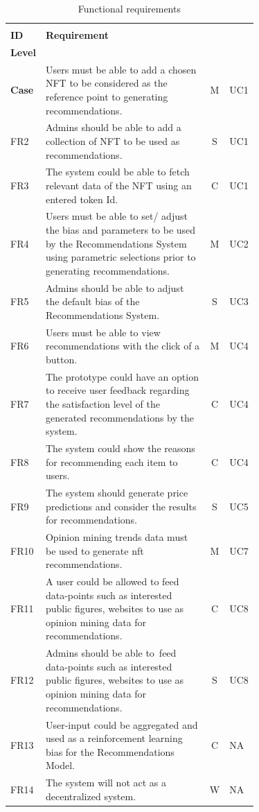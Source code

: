 \begin{longtable}{|l|p{0.71\linewidth}|c|l|}
\caption{Functional requirements}\\ 
\hline
\begin{tabular}[c]{@{}l@{}}\textbf{FR}\\\textbf{ID}\end{tabular}
& \textbf{Requirement} & \begin{tabular}[c]{@{}c@{}}\textbf{Priority}\\\textbf{Level}\end{tabular} & 
\begin{tabular}[c]{@{}c@{}}\textbf{Use}\\\textbf{Case}\end{tabular}
\endfirsthead 
\hline
FR1 & Users must be able to add a chosen NFT to be considered as the reference point to generating recommendations. & M & UC1 \\ 
\hline
FR2 & Admins should be able to add a collection of NFT to be used as recommendations. & S & UC1 \\ 
\hline
FR3 & The system could be able to fetch relevant data of the NFT using an entered token Id. & C & UC1 \\ 
\hline
FR4 & Users must be able to set/ adjust the bias and parameters to be used by the Recommendations System using parametric selections prior to generating recommendations. & M & UC2 \\ 
\hline
FR5 & Admins should be able to adjust the default bias of the Recommendations System. & S & UC3 \\ 
\hline
FR6 & Users must be able to view recommendations with the click of a button. & M & UC4 \\
\hline
FR7 & The prototype could have an option to receive user feedback regarding the satisfaction level of the generated recommendations by the system. & C & UC4 \\
\hline
FR8 & The system could show the reasons for recommending each item to users. & C & UC4 \\ \hline
FR9 & The system should generate price predictions and consider the results for recommendations. & S & UC5 \\ 
\hline
FR10 & Opinion mining trends data must be used to generate \gls{nft} recommendations. & M & UC7 \\
\hline
FR11 & A user could be allowed to feed data-points such as interested public figures, websites to use as opinion mining data for recommendations. & C & UC8 \\ 
\hline
FR12 & Admins should be able to~feed data-points such as interested public figures, websites to use as opinion mining data for recommendations. & S & UC8 \\
\hline
FR13 & User-input could be aggregated and used as a reinforcement learning bias for the Recommendations Model. & C & NA  \\
\hline
FR14 & The system will not act as a decentralized system. & W & NA \\
\hline
\end{longtable}

